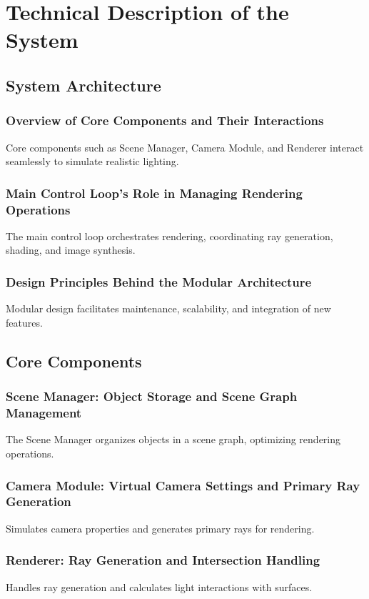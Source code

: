 \documentclass[12pt]{article}
\begin{document}
\section{Technical Description of the System}
\label{sec:system-description}

\subsection{System Architecture}
\subsubsection{Overview of Core Components and Their Interactions}
Core components such as Scene Manager, Camera Module, and Renderer interact seamlessly to simulate realistic lighting.

\subsubsection{Main Control Loop's Role in Managing Rendering Operations}
The main control loop orchestrates rendering, coordinating ray generation, shading, and image synthesis.

\subsubsection{Design Principles Behind the Modular Architecture}
Modular design facilitates maintenance, scalability, and integration of new features.

\subsection{Core Components}
\subsubsection{Scene Manager: Object Storage and Scene Graph Management}
The Scene Manager organizes objects in a scene graph, optimizing rendering operations.

\subsubsection{Camera Module: Virtual Camera Settings and Primary Ray Generation}
Simulates camera properties and generates primary rays for rendering.

\subsubsection{Renderer: Ray Generation and Intersection Handling}
Handles ray generation and calculates light interactions with surfaces.
\end{document}
